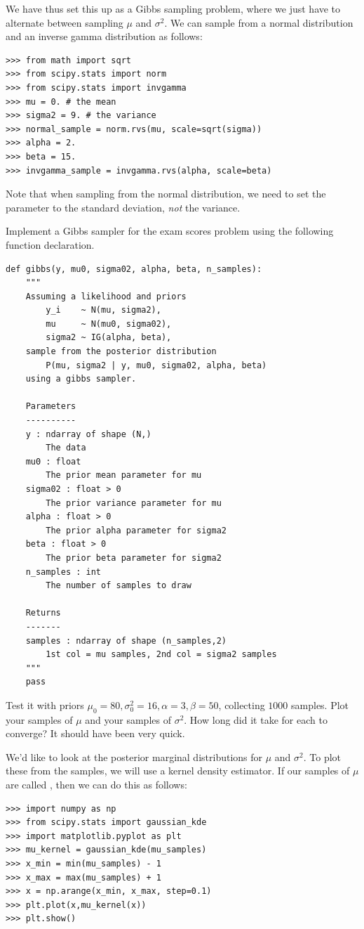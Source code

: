 We have thus set this up as a Gibbs sampling problem, where we just have to alternate between sampling $\mu$ and $\sigma^{2}$.
We can sample from a normal distribution and an inverse gamma distribution as follows:
\begin{lstlisting}
>>> from math import sqrt
>>> from scipy.stats import norm
>>> from scipy.stats import invgamma
>>> mu = 0. # the mean
>>> sigma2 = 9. # the variance
>>> normal_sample = norm.rvs(mu, scale=sqrt(sigma))
>>> alpha = 2.
>>> beta = 15.
>>> invgamma_sample = invgamma.rvs(alpha, scale=beta)
\end{lstlisting}
Note that when sampling from the normal distribution, we need to set the  parameter to the standard deviation, \emph{not} the variance.

\begin{problem}
Implement a Gibbs sampler for the exam scores problem using the following function declaration.
\begin{lstlisting}
def gibbs(y, mu0, sigma02, alpha, beta, n_samples):
    """
    Assuming a likelihood and priors
        y_i    ~ N(mu, sigma2),
        mu     ~ N(mu0, sigma02),
        sigma2 ~ IG(alpha, beta),
    sample from the posterior distribution
        P(mu, sigma2 | y, mu0, sigma02, alpha, beta)
    using a gibbs sampler.

    Parameters
    ----------
    y : ndarray of shape (N,)
        The data
    mu0 : float
        The prior mean parameter for mu
    sigma02 : float > 0
        The prior variance parameter for mu
    alpha : float > 0
        The prior alpha parameter for sigma2
    beta : float > 0
        The prior beta parameter for sigma2
    n_samples : int
        The number of samples to draw

    Returns
    -------
    samples : ndarray of shape (n_samples,2)
        1st col = mu samples, 2nd col = sigma2 samples
    """
    pass
\end{lstlisting}
Test it with priors $\mu_{0}=80, \sigma_{0}^{2} = 16, \alpha = 3, \beta = 50$, collecting $1000$ samples. Plot your samples of $\mu$ and your samples of $\sigma^{2}$. How long did it take for each to converge? It should have been very quick.
\end{problem}

We'd like to look at the posterior marginal distributions for $\mu$ and $\sigma^2$.
To plot these from the samples, we will use a kernel density estimator.
If our samples of $\mu$ are called , then we can do this as follows:
\begin{lstlisting}
>>> import numpy as np
>>> from scipy.stats import gaussian_kde
>>> import matplotlib.pyplot as plt
>>> mu_kernel = gaussian_kde(mu_samples)
>>> x_min = min(mu_samples) - 1
>>> x_max = max(mu_samples) + 1
>>> x = np.arange(x_min, x_max, step=0.1)
>>> plt.plot(x,mu_kernel(x))
>>> plt.show()
\end{lstlisting}

